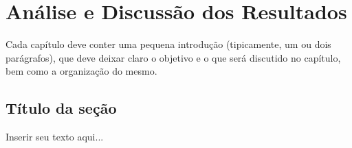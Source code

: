 
\chapter{Análise e Discussão dos Resultados}

Cada capítulo deve conter uma pequena introdução (tipicamente, um ou dois parágrafos), que deve deixar claro o objetivo e o que será discutido no capítulo, bem como a organização do mesmo.

\section{Título da seção}
\label{sec_titulo_da_secao_resultados}

Inserir seu texto aqui...
